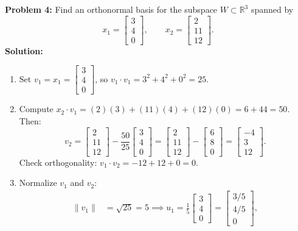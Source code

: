 \documentclass[11pt, letterpaper]{article}
\theoremstyle{definition}
\theoremstyle{remark}
\begin{document}
\textbf{Problem 4:} Find an orthonormal basis for the subspace $W \subset \mathbb{R}^3$ spanned by
\[
    x_1 = \begin{bmatrix} 3 \\ 4 \\ 0 \end{bmatrix}, \qquad x_2 = \begin{bmatrix} 2 \\ 11 \\ 12 \end{bmatrix}.
\]
\textbf{Solution:}
\begin{enumerate}[label=\textbf{Step \arabic*:}]
    \item Set $v_1 = x_1 = \begin{bmatrix} 3 \\ 4 \\ 0 \end{bmatrix}$, so $v_1 \cdot v_1 = 3^2 + 4^2 + 0^2 = 25$.
    \item Compute $x_2 \cdot v_1 = (2)(3) + (11)(4) + (12)(0) = 6 + 44 = 50$. Then:
    \[
        v_2 = \begin{bmatrix} 2 \\ 11 \\ 12 \end{bmatrix} - \frac{50}{25}\begin{bmatrix} 3 \\ 4 \\ 0 \end{bmatrix}
        = \begin{bmatrix} 2 \\ 11 \\ 12 \end{bmatrix} - \begin{bmatrix} 6 \\ 8 \\ 0 \end{bmatrix}
        = \begin{bmatrix} -4 \\ 3 \\ 12 \end{bmatrix}.
    \]
    Check orthogonality: $v_1 \cdot v_2 = -12 + 12 + 0 = 0$.
    \item Normalize $v_1$ and $v_2$:
    \begin{align*}
        \|v_1\| &= \sqrt{25} = 5 \implies u_1 = \frac{1}{5}\begin{bmatrix} 3 \\ 4 \\ 0 \end{bmatrix} = \begin{bmatrix} 3/5 \\ 4/5 \\ 0 \end{bmatrix}, \\

\end{align*}
\end{enumerate}
\end{document}
